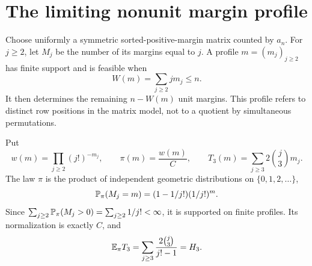 \section{The limiting nonunit margin profile}\label{tks:sec:margins}
Choose uniformly a symmetric sorted-positive-margin matrix counted by $a_n$. For $j\geq2$, let $M_j$ be the number of its margins equal to $j$. A profile $m=(m_j)_{j\geq2}$ has finite support and is feasible when
\begin{equation}\label{tks:eq:marginweight}
W(m)=\sum_{j\geq2}jm_j\leq n.
\end{equation}
It then determines the remaining $n-W(m)$ unit margins. This profile refers to distinct row positions in the matrix model, not to a quotient by simultaneous permutations.

Put
\begin{equation}\label{tks:eq:pilaw}
w(m)=\prod_{j\geq2}(j!)^{-m_j},\qquad
\pi(m)=\frac{w(m)}{C},\qquad
T_3(m)=\sum_{j\geq3}2\binom j3m_j.
\end{equation}
The law $\pi$ is the product of independent geometric distributions on $\{0,1,2,\ldots\}$,
\begin{equation}\label{tks:eq:geommargin}
\mathbb P_\pi(M_j=m)=(1-1/j!)(1/j!)^m.
\end{equation}
Since $\sum_{j\geq2}\mathbb P_\pi(M_j>0)=\sum_{j\geq2}1/j!<\infty$, it is supported on finite profiles. Its normalization is exactly $C$, and
\begin{equation}\label{tks:eq:ET3}
\mathbb E_\pi T_3=\sum_{j\geq3}\frac{2\binom j3}{j!-1}=H_3.
\end{equation}

